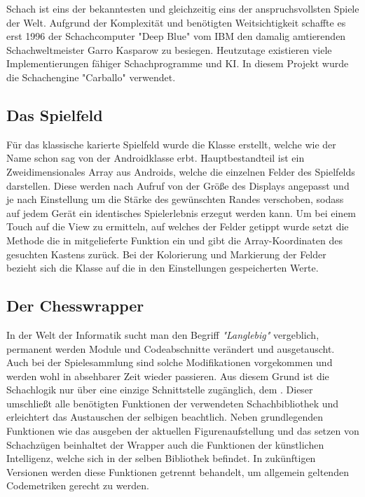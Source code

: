 Schach ist eins der bekanntesten und gleichzeitig eins der anspruchsvollsten
Spiele der Welt. Aufgrund der Komplexität und benötigten Weitsichtigkeit
schaffte es erst 1996 der Schachcomputer "Deep Blue" vom IBM den damalig
amtierenden Schachweltmeister Garro Kasparow zu besiegen. 
Heutzutage existieren viele Implementierungen fähiger Schachprogramme und KI.
In diesem Projekt wurde die Schachengine "Carballo" verwendet.  

\subsection{Das Spielfeld}

Für das klassische karierte Spielfeld wurde die Klasse
 erstellt, welche wie der Name schon sag von der
Androidklasse  erbt. Hauptbestandteil ist ein Zweidimensionales
Array aus Androids, welche die einzelnen Felder des Spielfelds
darstellen. Diese werden nach Aufruf von  der Größe des
Displays angepasst und je nach Einstellung um die Stärke des gewünschten Randes
verschoben, sodass auf jedem Gerät ein identisches Spielerlebnis erzegut werden
kann. Um bei einem Touch auf die View zu ermitteln, auf welches der Felder
getippt wurde setzt die Methode  die in
 mitgelieferte Funktion  ein und gibt
die Array-Koordinaten des gesuchten Kastens zurück. Bei der Kolorierung und
Markierung der Felder bezieht sich die Klasse auf die in den Einstellungen
gespeicherten Werte.

\subsection{Der Chesswrapper}

In der Welt der Informatik sucht man den Begriff \emph{"Langlebig"} vergeblich,
permanent werden Module und Codeabschnitte verändert und ausgetauscht. Auch bei
der Spielesammlung sind solche Modifikationen vorgekommen und werden wohl in
absehbarer Zeit wieder passieren. Aus diesem Grund ist die Schachlogik nur über
eine einzige Schnittstelle zugänglich, dem . Dieser
umschließt alle benötigten Funktionen der verwendeten Schachbibliothek und
erleichtert das Austauschen der selbigen beachtlich. Neben grundlegenden
Funktionen wie das ausgeben der aktuellen Figurenaufstellung und das setzen von
Schachzügen beinhaltet der Wrapper auch die Funktionen der künstlichen
Intelligenz, welche sich in der selben Bibliothek befindet. In zukünftigen
Versionen werden diese Funktionen getrennt behandelt, um allgemein geltenden
Codemetriken gerecht zu werden. 

